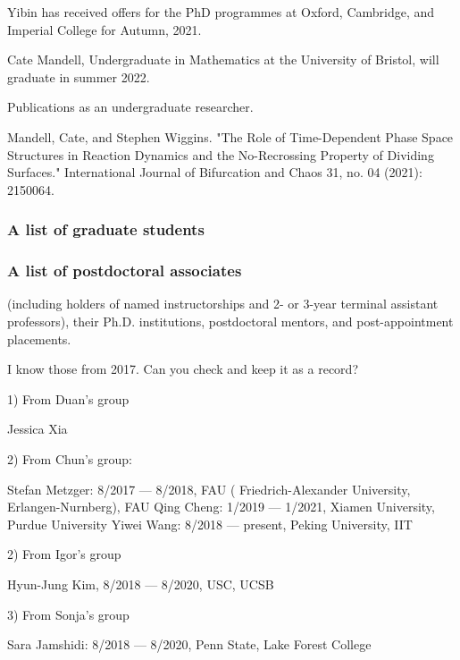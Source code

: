 \documentclass[11pt]{article}
\begin{document}
 

Yibin has received offers for the PhD programmes at Oxford, Cambridge, and Imperial College for  Autumn, 2021.

 

 

 

Cate Mandell, Undergraduate in Mathematics at the University of Bristol, will graduate in summer 2022.

 

Publications as an undergraduate researcher.

 

 

Mandell, Cate, and Stephen Wiggins. "The Role of Time-Dependent Phase Space Structures in Reaction Dynamics and the No-Recrossing Property of Dividing Surfaces." International Journal of Bifurcation and Chaos 31, no. 04 (2021): 2150064.




\subsubsection{A list of graduate students}


\subsubsection{A list of postdoctoral associates}
  
  (including holders of named
     instructorships and 2- or 3-year terminal assistant professors),
     their Ph.D. institutions, postdoctoral mentors, and post-appointment
     placements.

     I know those from 2017. Can you check and keep it as a record?

     1) From Duan's group
     
     Jessica Xia 
     
     
     2) From Chun’s group:

     Stefan Metzger: 8/2017 — 8/2018, FAU ( Friedrich-Alexander
     University, Erlangen-Nurnberg), FAU
     Qing Cheng: 1/2019 — 1/2021, Xiamen University, Purdue University
     Yiwei Wang: 8/2018 — present, Peking University, IIT

     2) From Igor’s group

     Hyun-Jung Kim, 8/2018  — 8/2020, USC, UCSB

     3) From Sonja’s group

     Sara Jamshidi: 8/2018 — 8/2020, Penn State, Lake Forest College
\end{document}
